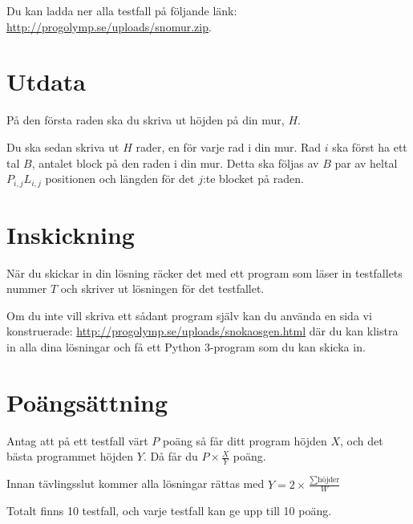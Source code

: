 Du kan ladda ner alla testfall på följande länk: \url{http://progolymp.se/uploads/snomur.zip}.

\section*{Utdata}
På den första raden ska du skriva ut höjden på din mur, $H$.

Du ska sedan skriva ut $H$ rader, en för varje rad i din mur.
Rad $i$ ska först ha ett tal $B$, antalet block på den raden i din mur.
Detta ska följas av $B$ par av heltal $P_{i,j} L_{i,j}$ positionen och längden för det $j$:te blocket på raden.

\section*{Inskickning}
När du skickar in din lösning räcker det med ett program som läser in testfallets nummer $T$ och skriver ut lösningen för det testfallet.

Om du inte vill skriva ett sådant program själv kan du använda en sida vi konstruerade: \url{http://progolymp.se/uploads/snokaosgen.html} där du kan klistra in
alla dina lösningar och få ett Python 3-program som du kan skicka in.

\section*{Poängsättning}
Antag att på ett testfall värt $P$ poäng så får ditt program höjden $X$, och det bästa programmet höjden $Y$. Då får du $P \times \frac{X}{Y}$ poäng.

Innan tävlingsslut kommer alla lösningar rättas med $Y = 2 \times \frac{\sum{\text{höjder}}}{W}$

Totalt finns 10 testfall, och varje testfall kan ge upp till 10 poäng.
